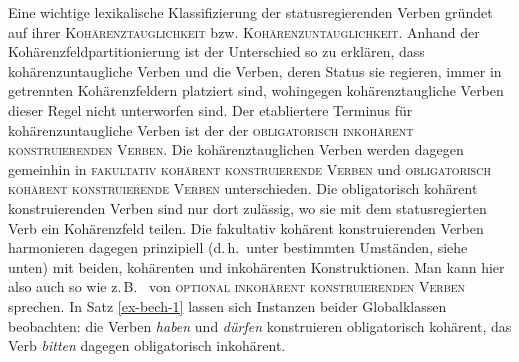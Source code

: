 Eine wichtige lexikalische Klassifizierung der statusregierenden Verben gründet auf ihrer \textsc{Kohärenztauglichkeit} bzw. \textsc{Kohärenzuntauglichkeit}. Anhand der Kohärenzfeldpartitionierung ist der Unterschied so zu erklären, dass kohärenzuntaugliche Verben und die Verben, deren Status sie regieren, immer in getrennten Kohärenzfeldern platziert sind, wohingegen kohärenztaugliche Verben dieser Regel nicht unterworfen sind. Der etabliertere Terminus für kohärenzuntaugliche Verben ist der der \textsc{obligatorisch inkohärent konstruierenden Verben}. Die kohärenztauglichen Verben werden dagegen gemeinhin in \textsc{fakultativ kohärent konstruierende Verben} und \textsc{obligatorisch kohärent konstruierende Verben} unterschieden. Die obligatorisch kohärent konstruierenden Verben sind nur dort zulässig, wo sie mit dem statusregierten Verb ein Kohärenzfeld teilen. Die fakultativ kohärent konstruierenden Verben harmonieren dagegen prinzipiell (d.\,h.\ unter bestimmten Umständen, siehe unten) mit beiden, kohärenten und inkohärenten Konstruktionen. Man kann hier also auch so wie z.\,B.\ \citet[38]{Meurers:99} von \textsc{optional inkohärent konstruierenden Verben} sprechen. In Satz \ref{ex-bech-1} lassen sich Instanzen beider Globalklassen beobachten: die Verben {\it haben} und {\it dürfen} konstruieren obligatorisch kohärent, das Verb {\it bitten} dagegen obligatorisch inkohärent. 

